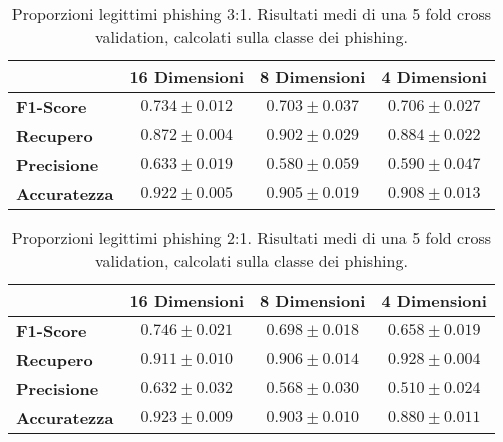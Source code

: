 \documentclass[../../main.tex]{subfiles}
\begin{document}
    \begin{table}[H]
        \centering
        \begin{tabular}{lccc}
            \toprule
            {} &                      \textbf{16 Dimensioni} & \textbf{8 Dimensioni} & \textbf{4 Dimensioni} \\
            \midrule
            \textbf{F1-Score }      &      $0.734 \pm 0.012$ & $0.703 \pm 0.037$ & $0.706 \pm 0.027$\\
            \textbf{Recupero   }    &      $0.872 \pm 0.004$ & $0.902 \pm 0.029$ & $0.884 \pm 0.022$\\
            \textbf{Precisione}     &      $0.633 \pm 0.019$ & $0.580 \pm 0.059$ & $0.590 \pm 0.047$\\
            \textbf{Accuratezza }   &      $0.922 \pm 0.005$ & $0.905 \pm 0.019$ & $0.908 \pm 0.013$\\
            \bottomrule
        \end{tabular}     
        \caption{Proporzioni legittimi phishing 3:1. Risultati medi di una 5 fold cross validation, calcolati sulla classe dei phishing.}   
        \label{tab:3a1Undersampling}
    \end{table}

    \begin{table}[H]
        \centering
        \begin{tabular}{lccc}
            \toprule
            {} &                      \textbf{16 Dimensioni} & \textbf{8 Dimensioni} & \textbf{4 Dimensioni} \\
            \midrule
            \textbf{F1-Score }      &      $0.746 \pm 0.021$ & $0.698 \pm 0.018$ & $0.658 \pm 0.019$\\
            \textbf{Recupero   }    &      $0.911 \pm 0.010$ & $0.906 \pm 0.014$ & $0.928 \pm 0.004$\\
            \textbf{Precisione}     &      $0.632 \pm 0.032$ & $0.568 \pm 0.030$ & $0.510 \pm 0.024$\\
            \textbf{Accuratezza }   &      $0.923 \pm 0.009$ & $0.903 \pm 0.010$ & $0.880 \pm 0.011$\\
            \bottomrule
        \end{tabular}     
        \caption{Proporzioni legittimi phishing 2:1. Risultati medi di una 5 fold cross validation, calcolati sulla classe dei phishing.} 
        \label{tab:2a1Undersampling}  
    \end{table}
\end{document}
